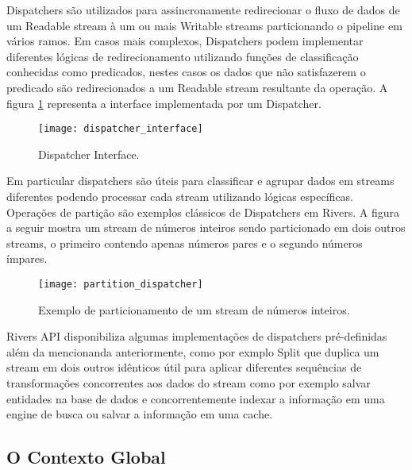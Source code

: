 Dispatchers são utilizados para assincronamente redirecionar o fluxo de dados de um Readable stream à um ou mais Writable streams particionando o pipeline em vários ramos. Em casos mais complexos, Dispatchers podem implementar diferentes lógicas de redirecionamento utilizando funções de classificação conhecidas como predicados, nestes casos os dados que não satisfazerem o predicado são redirecionados a um Readable stream resultante da operação. A figura \ref{code:rivers:dispatcher} representa a interface implementada por um Dispatcher.

\begin{figure}[H]
  \texttt{[image: dispatcher\_interface]}
  \centering
  \caption{Dispatcher Interface.}
  \label{code:rivers:dispatcher}
\end{figure}

Em particular dispatchers são úteis para classificar e agrupar dados em streams diferentes podendo processar cada stream utilizando lógicas específicas. Operações de partição são exemplos clássicos de Dispatchers em Rivers. A figura a seguir mostra um stream de números inteiros sendo particionado em dois outros streams, o primeiro contendo apenas números pares e o segundo números ímpares.

\begin{figure}[H]
  \texttt{[image: partition\_dispatcher]}
  \centering
  \caption{Exemplo de particionamento de um stream de números inteiros.}
  \label{code:rivers:partition_dispatcher}
\end{figure}

Rivers API disponibiliza algumas implementações de dispatchers pré-definidas além da mencionanda anteriormente, como por exmplo Split que duplica um stream em dois outros idênticos útil para aplicar diferentes sequências de transformações concorrentes aos dados do stream como por exemplo salvar entidades na base de dados e concorrentemente indexar a informação em uma engine de busca ou salvar a informação em uma cache.

\subsection{O Contexto Global}
\label{sec:rivers:context}

